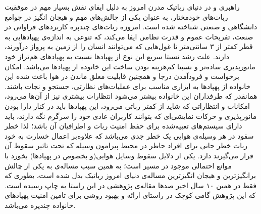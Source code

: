راهبری و  در دنیای رباتیک مدرن امروز به دلیل ایفای نقش بسیار مهم در موفقیت ربات‌های خودمختار، به عنوان یکی از چالش‌های مهم و هیجان انگیز در جوامع دانشگاهی و صنعتی شناخته شده است. امروزه ربات‌های چندپره کاربردهای فراوانی در صنعت، تفریحات عموم و قدرت نظامی ایفا می‌کند، که تنوعی به اندازه‌ی پهپادهایی به قطر کمتر از ۳ سانتی‌متر تا غول‌هایی که می‌توانند انسان را از زمین به پرواز درآورند، دارند. علت رشد نسبتا سریع این نوع از پهپادها نسبت به پهپادهای هم‌تراز خود مانورپذیری ساده‌تر و نسبتا کم‌هزینه بودن ساخت این خانوده از پهپاد‌ها می‌باشد. امکان برخواست و فرود‌آمدن درجا و همچنین قابلیت معلق ماندن در هوا باعث شده این خانواده از پهپادها به ابزاری مناسب برای عملیات‌های نظارتی، جستجو و نجات باشند.
همانقدر که طرفداران این خانواده‌ بیشتر می‌شود انتظارات بیشتری نیز از آن‌ها می‌رود، امکانات و انتظاراتی که شاید از کمتر رباتی می‌رود، این پهپادها باید در کنار دارا بودن مانورپذیری و حرکات نمایشی‌ای که بتوانند کاربران عادی خود را سرگرم نگه دارند، باید دارای سیستم‌های تعبیه‌شده برای حفظ امنیت ربات و اطرافیان آن باشد؛ لذا خطر سقود در هر وسیله‌ی هوایی یک خطر جدی می‌باشد که علاوه‌بر اعمال خسارت به خود ربات خطر جانی برای افراد حاظر در محیط پیرامون وسیله که تحت تاثیر سقوط آن قرار می‌گیرند دارد. یکی از دلایل سقوط وسایل هوایی(و بخصوص در پهپاد‌ها) بخورد با موانع احتمالی موجود در مسیر است؛ به همین سبب مساله‌ی  به یکی از چالش برانگیزترین و هیجان انگیزترین مساله‌ی دنیای امروز رباتیک بدل شده است، بطوری که فقط در همین ۱۰ سال اخیر صدها مقاله‌ی پژوهشی در این راستا به چاپ رسیده است. که این پژوهش گامی کوچک در راستای ارائه و بهبود روشی برای تامین امنیت پهپادهای خانواده چندپره‌ می‌باشد.